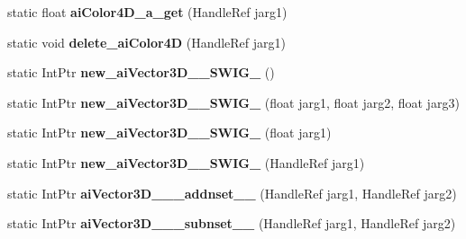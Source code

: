\begin{DoxyCompactItemize}
\item 
\hypertarget{class_assimp_p_i_n_v_o_k_e_a568c70bf9ab93f3493716ab6e0ae84ef}{static float {\bfseries ai\+Color4\+D\+\_\+a\+\_\+get} (Handle\+Ref jarg1)}\label{class_assimp_p_i_n_v_o_k_e_a568c70bf9ab93f3493716ab6e0ae84ef}

\item 
\hypertarget{class_assimp_p_i_n_v_o_k_e_a57a8114d1a71e2f0f30eb7f1ca8a8eb4}{static void {\bfseries delete\+\_\+ai\+Color4\+D} (Handle\+Ref jarg1)}\label{class_assimp_p_i_n_v_o_k_e_a57a8114d1a71e2f0f30eb7f1ca8a8eb4}

\item 
\hypertarget{class_assimp_p_i_n_v_o_k_e_a507f79f6bec70cf6accbd51038f198a5}{static Int\+Ptr {\bfseries new\+\_\+ai\+Vector3\+D\+\_\+\+\_\+\+S\+W\+I\+G\+\_} ()}\label{class_assimp_p_i_n_v_o_k_e_a507f79f6bec70cf6accbd51038f198a5}

\item 
\hypertarget{class_assimp_p_i_n_v_o_k_e_a0c5f67e730186e531d891d4e0b1d56dd}{static Int\+Ptr {\bfseries new\+\_\+ai\+Vector3\+D\+\_\+\+\_\+\+S\+W\+I\+G\+\_} (float jarg1, float jarg2, float jarg3)}\label{class_assimp_p_i_n_v_o_k_e_a0c5f67e730186e531d891d4e0b1d56dd}

\item 
\hypertarget{class_assimp_p_i_n_v_o_k_e_acf8303d5567be25f7195a0b7a99308d0}{static Int\+Ptr {\bfseries new\+\_\+ai\+Vector3\+D\+\_\+\+\_\+\+S\+W\+I\+G\+\_} (float jarg1)}\label{class_assimp_p_i_n_v_o_k_e_acf8303d5567be25f7195a0b7a99308d0}

\item 
\hypertarget{class_assimp_p_i_n_v_o_k_e_a92c7aedc7b1891ccf21c4e3aa1ce4233}{static Int\+Ptr {\bfseries new\+\_\+ai\+Vector3\+D\+\_\+\+\_\+\+S\+W\+I\+G\+\_} (Handle\+Ref jarg1)}\label{class_assimp_p_i_n_v_o_k_e_a92c7aedc7b1891ccf21c4e3aa1ce4233}

\item 
\hypertarget{class_assimp_p_i_n_v_o_k_e_adec4b21a18015288a41ee9d7b4722723}{static Int\+Ptr {\bfseries ai\+Vector3\+D\+\_\+\+\_\+\+\_\+addnset\+\_\+\+\_\+} (Handle\+Ref jarg1, Handle\+Ref jarg2)}\label{class_assimp_p_i_n_v_o_k_e_adec4b21a18015288a41ee9d7b4722723}

\item 
\hypertarget{class_assimp_p_i_n_v_o_k_e_adad1567d0f91373d71afc1e3bf578537}{static Int\+Ptr {\bfseries ai\+Vector3\+D\+\_\+\+\_\+\+\_\+subnset\+\_\+\+\_\+} (Handle\+Ref jarg1, Handle\+Ref jarg2)}\label{class_assimp_p_i_n_v_o_k_e_adad1567d0f91373d71afc1e3bf578537}


\end{DoxyCompactItemize}
